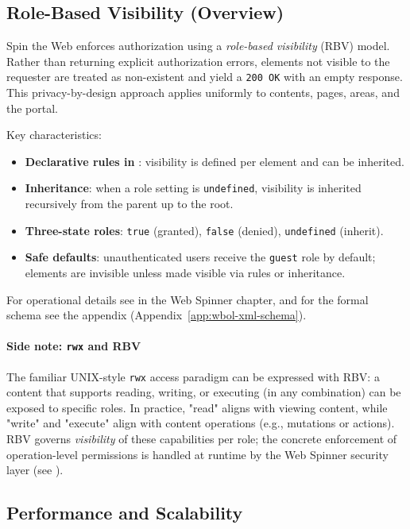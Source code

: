 \subsection{Role-Based Visibility (Overview)}
\label{sec:rbv-overview}

Spin the Web enforces authorization using a \emph{role-based visibility} (RBV) model. Rather than returning explicit authorization errors, elements not visible to the requester are treated as non-existent and yield a \texttt{200 OK} with an empty response. This privacy-by-design approach applies uniformly to contents, pages, areas, and the portal.

Key characteristics:
\begin{itemize}
	\item \textbf{Declarative rules in \wbol{}}: visibility is defined per element and can be inherited.
	\item \textbf{Inheritance}: when a role setting is \texttt{undefined}, visibility is inherited recursively from the parent up to the root.
	\item \textbf{Three-state roles}: \texttt{true} (granted), \texttt{false} (denied), \texttt{undefined} (inherit).
	\item \textbf{Safe defaults}: unauthenticated users receive the \texttt{guest} role by default; elements are invisible unless made visible via rules or inheritance.
\end{itemize}

For operational details see  in the Web Spinner chapter, and for the formal schema see the \wbol{} appendix (Appendix~\ref{app:wbol-xml-schema}).

\paragraph{Side note: \texttt{rwx} and RBV}
The familiar UNIX-style \texttt{rwx} access paradigm can be expressed with RBV: a content that supports reading, writing, or executing (in any combination) can be exposed to specific roles. In practice, "read" aligns with viewing content, while "write" and "execute" align with content operations (e.g., mutations or actions). RBV governs \emph{visibility} of these capabilities per role; the concrete enforcement of operation-level permissions is handled at runtime by the Web Spinner security layer (see ).

\subsection{Performance and Scalability}

